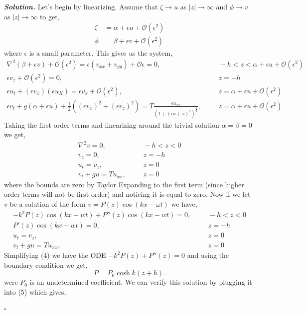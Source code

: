 \documentclass[12pt]{report}
\newenvironment{solution}[1][\it{Solution}]{\textbf{#1. } }{$\square$}
\def\O{{\mathcal{O}}}
\begin{document}
\begin{solution}
    \noindent
    Let's begin by linearizing. Assume that $\zeta \rightarrow u$ as $|z| \rightarrow \infty$ and $\phi \rightarrow v$ as $|z| \rightarrow \infty$ to get,
    \begin{align*}
        \zeta &= \alpha + \epsilon u + \O(\epsilon^2)\\
        \phi &= \beta + \epsilon v + \O(\epsilon^2)
    \end{align*}
    where $\epsilon$ is a small parameter. This gives us the system,
    \begin{eqnarray*}
    \nabla^2(\beta + \epsilon v) +  \O(\epsilon^2)=\epsilon(v_{xx} + v_{yy})+ \O{\epsilon} = 0,&& ~~~~-h<z<\alpha + \epsilon u + \O(\epsilon^2)\\
    \epsilon v_{z} + \O(\epsilon^2)=0, && ~~~~ z=-h\\
    \epsilon u_t + (\epsilon v_x)(\epsilon u_X) = \epsilon v_x + \O(\epsilon^2), && ~~~~z=\alpha + \epsilon u + \O(\epsilon^2)\\
    \epsilon v_t + g(\alpha + \epsilon u) + \frac{1}{2}((\epsilon v_x)^2+(\epsilon v_z)^2) = T \frac{\epsilon u_{xx}}{\left(1+(\epsilon u+x)^2\right)^\frac{3}{2}}, && ~~~~z=\alpha + \epsilon u + \O(\epsilon^2)
    \end{eqnarray*}
    Taking the first order terms and linearizing around the trivial solution $\alpha = \beta = 0$ we get,
    \begin{eqnarray*}
        \nabla^2 v = 0,&& ~~~~-h<z<0\\
        v_{z} =0, && ~~~~ z=-h\\
        u_t = v_z, && ~~~~z=0\\
        v_t + gu = T u_{xx}, && ~~~~z=0
    \end{eqnarray*}
    where the bounds are zero by Taylor Expanding to the first term (since higher order terms will not be first order) and noticing it is equal to zero. Now if we let $v$ be a solution of the form $v = P(z)\cos(kx - \omega t)$ we have, 
    \begin{eqnarray}
        -k^2 P(z) \cos(kx - wt) + P''(z)\cos(kx - wt) = 0,&& ~~~~-h<z<0\\
        P'(z)\cos(kx - wt) =0, && ~~~~ z=-h\\
        u_t = v_z, && ~~~~z=0\\
        v_t + gu = T u_{xx}, && ~~~~z=0
    \end{eqnarray}
    Simplifying (4) we have the ODE $-k^2 P(z) + P''(z) = 0$ and using the boundary condition we get,
    \[ P = P_0 \cosh k(z + h).\] 
    were $P_0$ is an undetermined coefficient. We can verify this solution by plugging it into (5) which gives,

\end{solution}
\end{document}
